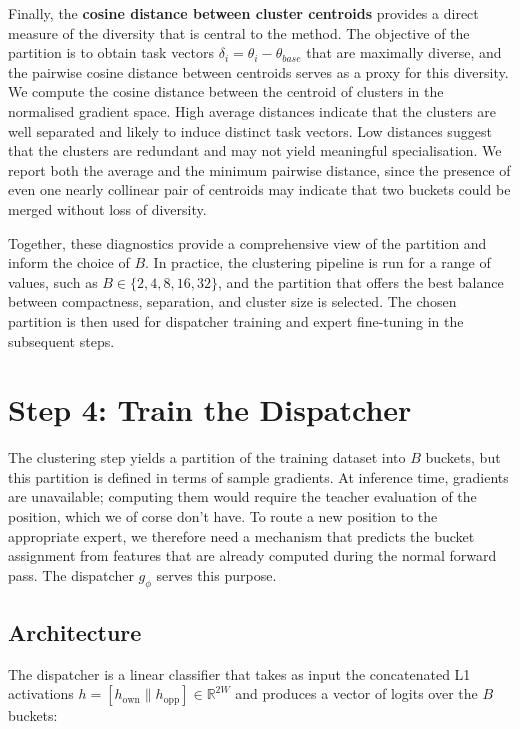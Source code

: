 Finally, the \textbf{cosine distance between cluster centroids} provides a direct measure of the diversity that is central to the method. The objective of the partition is to obtain task vectors $\delta_i=\theta_i-\theta_{base}$ that are maximally diverse, and the pairwise cosine distance between centroids serves as a proxy for this diversity. We compute the cosine distance between the centroid of clusters in the normalised gradient space. High average distances indicate that the clusters are well separated and likely to induce distinct task vectors. Low distances suggest that the clusters are redundant and may not yield meaningful specialisation. We report both the average and the minimum pairwise distance, since the presence of even one nearly collinear pair of centroids may indicate that two buckets could be merged without loss of diversity.

Together, these diagnostics provide a comprehensive view of the partition and inform the choice of $B$. In practice, the clustering pipeline is run for a range of values, such as $B\in\{2,4,8,16,32\}$, and the partition that offers the best balance between compactness, separation, and cluster size is selected. The chosen partition is then used for dispatcher training and expert fine-tuning in the subsequent steps.


\section{Step 4: Train the Dispatcher}

The clustering step yields a partition of the training dataset into $B$ buckets, but this partition is defined in terms of sample gradients. At inference time, gradients are unavailable; computing them would require the teacher evaluation of the position, which we of corse don't have. To route a new position to the appropriate expert, we therefore need a mechanism that predicts the bucket assignment from features that are already computed during the normal forward pass. The dispatcher $g_\phi$ serves this purpose.

\subsection{Architecture}

The dispatcher is a linear classifier that takes as input the concatenated L1 activations $h = [h_{\text{own}} \| h_{\text{opp}}] \in \mathbb{R}^{2W}$ and produces a vector of logits over the $B$ buckets:

